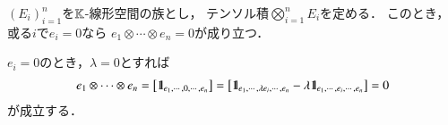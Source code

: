 	\begin{screen}
		\begin{thm}
			$(E_i)_{i=1}^n$を$\mathbb{K}$-線形空間の族とし，
			テンソル積$\bigotimes_{i=1}^n E_i$を定める．
			このとき，或る$i$で$e_i = 0$なら
			$e_1 \otimes \cdots \otimes e_n = 0$が成り立つ．
		\end{thm}
	\end{screen}
	
	\begin{prf}
		$e_i = 0$のとき，$\lambda = 0$とすれば
		\begin{align}
			e_1 \otimes \cdots \otimes e_n
			= \left[ \mbox{1}\hspace{-0.25em}\mbox{l}_{e_1,\cdots,0,\cdots,e_n} \right]
			= \left[ \mbox{1}\hspace{-0.25em}\mbox{l}_{e_1,\cdots,\lambda e_i,\cdots,e_n} - \lambda \mbox{1}\hspace{-0.25em}\mbox{l}_{e_1,\cdots,e_i,\cdots,e_n}\right]
			= 0
		\end{align}
		が成立する．
		\QED
	\end{prf}
	
